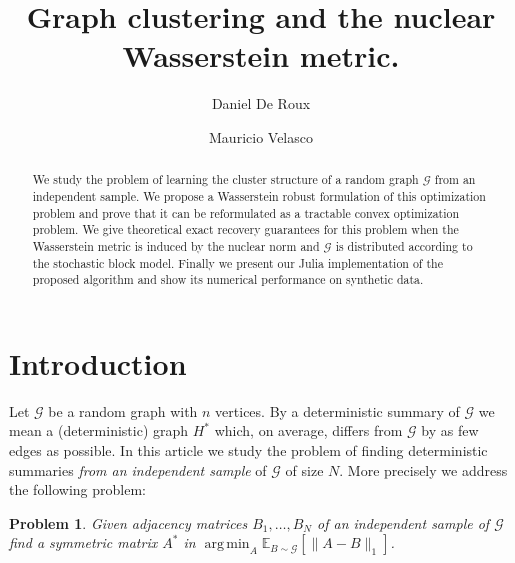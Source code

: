 \documentclass[12pt]{amsart}
\newtheorem{problem}[lemma]{Problem}
\theoremstyle{remark}
\DeclareMathOperator*{\argmin}{arg\,min}
\newcommand{\EE}{\mathbb{E}}
\newcommand{\grG}{{\mathcal{G}}}
\begin{document}
\author{Daniel De Roux}
\address{
Departamento de matem\'aticas\\
Universidad de los Andes\\
Carrera $1^{\rm ra}\#18A-12$\\ 
Bogot\'a, Colombia
}

\author{Mauricio Velasco}
\address{
Departamento de matem\'aticas\\
Universidad de los Andes\\
Carrera $1^{\rm ra}\#18A-12$\\ 
Bogot\'a, Colombia
}


\begin{abstract} We study the problem of learning the cluster structure of a random graph $\grG$ from an independent sample. We propose a Wasserstein robust formulation of this optimization problem and prove that it can be reformulated as a tractable convex optimization problem. We give theoretical exact recovery guarantees for this problem when the Wasserstein metric is induced by the nuclear norm and $\grG$ is distributed according to the stochastic block model. Finally we present our Julia implementation of the proposed algorithm and show its numerical performance on synthetic data.
\end{abstract} 

\title{Graph clustering and the nuclear Wasserstein metric.}
\maketitle

\section{Introduction}


Let $\grG$ be a random graph with $n$ vertices. By a deterministic summary of $\grG$ we mean a (deterministic) graph $H^*$ which, on average, differs from $\grG$ by as few edges as possible. In this article we study the problem of finding deterministic summaries {\it from an independent sample} of $\grG$ of size $N$. More precisely we address the following problem:

\begin{problem}\label{Prob} Given adjacency matrices $B_1,\dots, B_N$ of an independent sample of $\grG$ find a symmetric matrix $A^*$ in $\argmin_A \EE_{B\sim \grG}[\|A-B\|_1]$. 
\end{problem}
\end{document}
